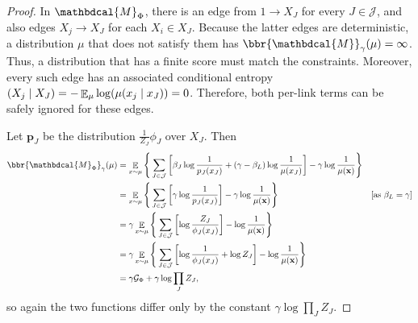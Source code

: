 \documentclass[letterpaper]{article} %
\theoremstyle{plain}
\theoremstyle{definition}
\theoremstyle{remark}
\let\H\relax
\DeclareMathOperator{\H}{\mathrm{H}} %
\DeclareMathOperator*{\E}{\mathbb{E}} %
\newcommand\mat[1]{\mathbf{#1}}
\newcommand{\dg}[1]{\mathbdcal{#1}}
\newcommand{\PDGof}[1]{{\dg M}_{#1}}
\begin{document}
\begin{proof}
  In $\PDGof{\Phi}$, there is an edge from $1 \to X_J$ for every $J
  \in \mathcal J$, and also edges $X_j \to X_J$ for each $X_i
    \in X_J$. Because the latter edges are deterministic, a
        distribution $\mu$ that does not satisfy them has $\bbr{\dg
M}_\gamma(\mu) = \infty$. 
          Thus, a distribution that 
        has a finite score must match the constraints. Moreover, every
        such edge has an associated conditional entropy $\H(X_j \mid
        X_J) = -\E_\mu\log(\mu(x_j \mid x_J)) = 0$. Therefore, both
        per-link terms can be safely ignored for these edges. 

	Let $\mat p_J$ be the distribution $\frac{1}{Z_J}\phi_J$
        over $X_J$. 
        Then
	\begin{align*}
	\bbr{\PDGof{\Phi}}_\gamma(\mu) &= \E_{ x \sim \mu} \Bigg\{   \sum_{ J \in \mathcal J } \left[
		\beta_J \log \frac{1}{ p_J(x_J) } + (\gamma - \beta_L ) \log \frac{1}{\mu(x_J)} \right] - \gamma \log \frac{1}{\mu(\mat x)} \Bigg\} \\
		&= \E_{ x \sim \mu} \Bigg\{  \sum_{ J \in \mathcal J }\left[
			\gamma \log \frac{1}{p_J(x_J)}  \right] - \gamma \log \frac{1}{\mu(\mat x)} \Bigg\} 
					&\text{[as $\beta_L = \gamma$]}\\
		&= \gamma \E_{x \sim \mu} \Bigg\{  \sum_{ J \in \mathcal J } \left[
			\log \frac{Z_J}{\phi_J(x_J)}  \right] -\log \frac{1}{\mu(\mat x)} \Bigg\} \\
		&= \gamma \E_{x \sim \mu} \Bigg\{  \sum_{ J \in \mathcal J } \left[
			\log \frac{1}{\phi_J(x_J)} + \log Z_J \right]  - \log \frac{1}{\mu(\mat x)} \Bigg\} \\
        	&= \gamma \mathcal G_{\Phi} + \gamma \log \prod_{J} Z_J,
	\end{align*}
 so again the two functions differ only by the constant
        $\gamma \log \prod_{J} Z_J$. 
\end{proof}
\end{document}
